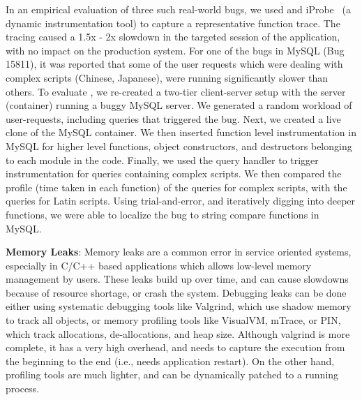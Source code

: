 In an empirical evaluation of three such real-world bugs, we used \parikshan and iProbe~\cite{iProbe} (a dynamic instrumentation tool) to capture a representative function trace.
The tracing caused a 1.5x - 2x slowdown in the targeted session of the application,  with no impact on the production system.
For one of the bugs in  MySQL (Bug 15811), it was reported that some of the user requests which were dealing with complex scripts (Chinese, Japanese), were running significantly slower than others.
To evaluate \parikshan, we re-created a two-tier client-server setup with the server (container) running a buggy MySQL server. 
We generated a random workload of user-requests, including queries that triggered the bug.
Next, we created a live clone of the MySQL container.
We then inserted function level instrumentation in MySQL for higher level functions, object constructors, and destructors belonging to each module in the code.
Finally, we used the query handler to trigger instrumentation for queries containing complex scripts.
We then compared the profile (time taken in each function) of the queries for complex scripts, with the queries for Latin scripts.
Using trial-and-error, and iteratively digging into deeper functions, we were able to localize the bug to string compare functions in MySQL.


\noindent
\textbf{Memory Leaks}: %
Memory leaks are a common error in service oriented systems, especially in C/C++ based applications which allows low-level memory management by users.
These leaks build up over time, and can cause slowdowns because of resource shortage, or crash the system.
Debugging leaks can be done either using systematic debugging tools like Valgrind, which use shadow memory to track all objects, or memory profiling tools like VisualVM, mTrace, or PIN, which track allocations, de-allocations, and heap size.
Although valgrind is more complete, it has a very high overhead, and needs to capture the execution from the beginning to the end (i.e., needs application restart).
On the other hand, profiling tools are much lighter, and can be dynamically patched to a running process.

